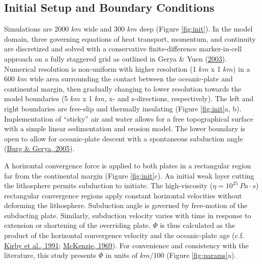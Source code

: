 \hypertarget{numBCs}{%
\subsection{Initial Setup and Boundary Conditions}\label{numBCs}}

Simulations are 2000 \(km\) wide and 300 \(km\) deep (Figure \ref{fig:init}). In the model domain, three governing equations of heat transport, momentum, and continuity are discretized and solved with a conservative finite-difference marker-in-cell approach on a fully staggered grid as outlined in Gerya \& Yuen (\protect\hyperlink{ref-gerya2003}{2003}). Numerical resolution is non-uniform with higher resolution (1 \(km\) x 1 \(km\)) in a 600 \(km\) wide area surrounding the contact between the oceanic-plate and continental margin, then gradually changing to lower resolution towards the model boundaries (5 \(km\) x 1 \(km\), x- and z-directions, respectively). The left and right boundaries are free-slip and thermally insulating (Figure \ref{fig:init}a, b). Implementation of ``sticky'' air and water allows for a free topographical surface with a simple linear sedimentation and erosion model. The lower boundary is open to allow for oceanic-plate descent with a spontaneous subduction angle (\protect\hyperlink{ref-burg2005}{Burg \& Gerya, 2005}).

A horizontal convergence force is applied to both plates in a rectangular region far from the continental margin (Figure \ref{fig:init}c). An initial weak layer cutting the lithosphere permits subduction to initiate. The high-viscosity (\(\eta = 10^{25}~Pa\cdot s\)) rectangular convergence regions apply constant horizontal velocities without deforming the lithosphere. Subduction angle is governed by free-motion of the subducting plate. Similarly, subduction velocity varies with time in response to extension or shortening of the overriding plate. \(\Phi\) is thus calculated as the product of the horizontal convergence velocity and the oceanic-plate age (c.f. \protect\hyperlink{ref-kirby1991}{Kirby et al., 1991}; \protect\hyperlink{ref-mckenzie1969}{McKenzie, 1969}). For convenience and consistency with the literature, this study presents \(\Phi\) in units of \(km\)/100 (Figure \ref{fig:params}a).

